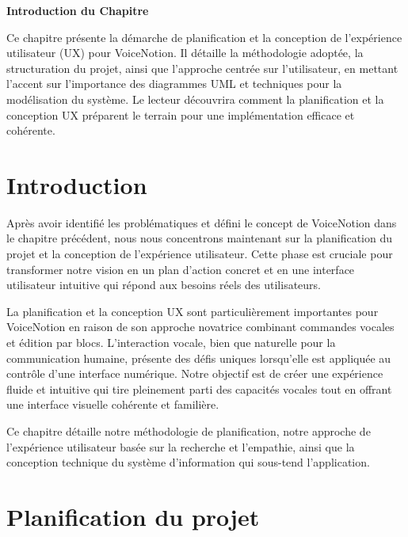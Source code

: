 
\begin{center}
\textbf{\large Introduction du Chapitre}
\end{center}

\noindent
Ce chapitre présente la démarche de planification et la conception de l'expérience utilisateur (UX) pour VoiceNotion. Il détaille la méthodologie adoptée, la structuration du projet, ainsi que l'approche centrée sur l'utilisateur, en mettant l'accent sur l'importance des diagrammes UML et techniques pour la modélisation du système. Le lecteur découvrira comment la planification et la conception UX préparent le terrain pour une implémentation efficace et cohérente.

\section{Introduction}

Après avoir identifié les problématiques et défini le concept de VoiceNotion dans le chapitre précédent, nous nous concentrons maintenant sur la planification du projet et la conception de l'expérience utilisateur. Cette phase est cruciale pour transformer notre vision en un plan d'action concret et en une interface utilisateur intuitive qui répond aux besoins réels des utilisateurs.

La planification et la conception UX sont particulièrement importantes pour VoiceNotion en raison de son approche novatrice combinant commandes vocales et édition par blocs. L'interaction vocale, bien que naturelle pour la communication humaine, présente des défis uniques lorsqu'elle est appliquée au contrôle d'une interface numérique. Notre objectif est de créer une expérience fluide et intuitive qui tire pleinement parti des capacités vocales tout en offrant une interface visuelle cohérente et familière.

Ce chapitre détaille notre méthodologie de planification, notre approche de l'expérience utilisateur basée sur la recherche et l'empathie, ainsi que la conception technique du système d'information qui sous-tend l'application.

\section{Planification du projet}


